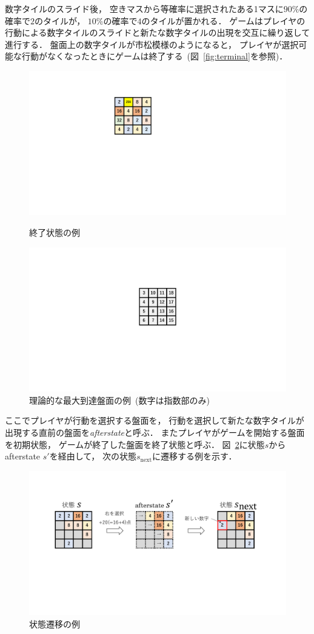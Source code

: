 数字タイルのスライド後， 空きマスから等確率に選択されたある1マスに$90\%$の確率で$2$のタイルが， $10\%$の確率で$4$のタイルが置かれる． 
ゲームはプレイヤの行動による数字タイルのスライドと新たな数字タイルの出現を交互に繰り返して進行する．
盤面上の数字タイルが市松模様のようになると， プレイヤが選択可能な行動がなくなったときにゲームは終了する~(図~\ref{fig:terminal}を参照)．
\begin{figure}[tbp]
\begin{minipage}[b]{0.48\linewidth{}}
    \centering
    \includegraphics[width=0.4\linewidth{}]{figures/terminal_.pdf}
    \caption{終了状態の例 \label{fig:terminal}}
\end{minipage}
\begin{minipage}[b]{0.48\linewidth{}}
    \centering
    \includegraphics[width=0.4\linewidth{}]{figures/limit.pdf}
    \caption{理論的な最大到達盤面の例~(数字は指数部のみ) \label{fig:limit}}
\end{minipage}
\end{figure}

ここでプレイヤが行動を選択する盤面を， 行動を選択して新たな数字タイルが出現する直前の盤面を\textit{afterstate}と呼ぶ．
またプレイヤがゲームを開始する盤面を初期状態， ゲームが終了した盤面を終了状態と呼ぶ．
図~\ref{fig:transition}に状態$s$からafterstate $s'$を経由して， 次の状態$s_{\text{next}}$に遷移する例を示す．

\begin{figure}[t]
    \centering
    \includegraphics[width=\linewidth{}]{figures/transition_.pdf}
    \caption{状態遷移の例 \label{fig:transition}}
\end{figure}

